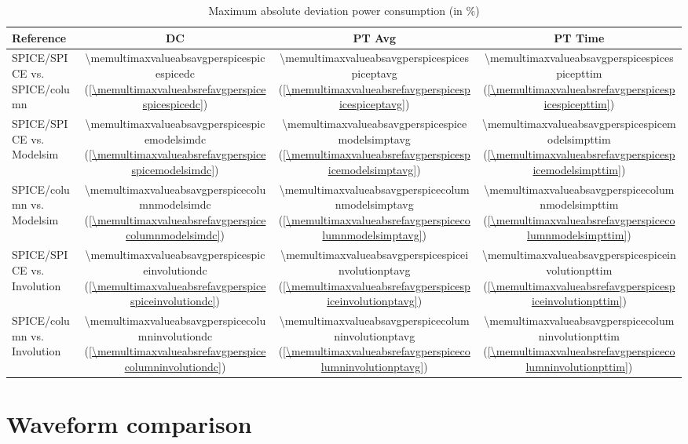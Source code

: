 \documentclass{article}
\begin{document}
\begin{table}[hbt]
\begin{tabular}{ l *{3}{|S[table-column-width=1.44cm]}} 
  {Reference} & {DC} & {PT Avg} & {PT Time} \\
  \hline			
  {SPICE/SPICE vs. SPICE/column} & 
  \num{\memultimaxvalueabsavgperspicespicespicedc} 
  {(\ref{\memultimaxvalueabsrefavgperspicespicespicedc})} & 
  \num{\memultimaxvalueabsavgperspicespicespiceptavg} 
  {(\ref{\memultimaxvalueabsrefavgperspicespicespiceptavg})} & 
  \num{\memultimaxvalueabsavgperspicespicespicepttim} 
  {(\ref{\memultimaxvalueabsrefavgperspicespicespicepttim})}\\
  \hline	
  {SPICE/SPICE vs. Modelsim} & 
  \num{\memultimaxvalueabsavgperspicespicemodelsimdc} 
  {(\ref{\memultimaxvalueabsrefavgperspicespicemodelsimdc})}& 
  \num{\memultimaxvalueabsavgperspicespicemodelsimptavg} 
  {(\ref{\memultimaxvalueabsrefavgperspicespicemodelsimptavg})}& 
  \num{\memultimaxvalueabsavgperspicespicemodelsimpttim} 
  {(\ref{\memultimaxvalueabsrefavgperspicespicemodelsimpttim})}\\
  {SPICE/column vs. Modelsim} & \num{\memultimaxvalueabsavgperspicecolumnmodelsimdc} {(\ref{\memultimaxvalueabsrefavgperspicecolumnmodelsimdc})}& \num{\memultimaxvalueabsavgperspicecolumnmodelsimptavg} {(\ref{\memultimaxvalueabsrefavgperspicecolumnmodelsimptavg})}& \num{\memultimaxvalueabsavgperspicecolumnmodelsimpttim} {(\ref{\memultimaxvalueabsrefavgperspicecolumnmodelsimpttim})}\\
  \hline	
  {SPICE/SPICE vs. Involution} & 
  \num{\memultimaxvalueabsavgperspicespiceinvolutiondc} 
  {(\ref{\memultimaxvalueabsrefavgperspicespiceinvolutiondc})}& 
  \num{\memultimaxvalueabsavgperspicespiceinvolutionptavg} 
  {(\ref{\memultimaxvalueabsrefavgperspicespiceinvolutionptavg})}& 
  \num{\memultimaxvalueabsavgperspicespiceinvolutionpttim} 
  {(\ref{\memultimaxvalueabsrefavgperspicespiceinvolutionpttim})}\\
  {SPICE/column vs. Involution} & \num{\memultimaxvalueabsavgperspicecolumninvolutiondc} {(\ref{\memultimaxvalueabsrefavgperspicecolumninvolutiondc})}& \num{\memultimaxvalueabsavgperspicecolumninvolutionptavg} {(\ref{\memultimaxvalueabsrefavgperspicecolumninvolutionptavg})}& \num{\memultimaxvalueabsavgperspicecolumninvolutionpttim} {(\ref{\memultimaxvalueabsrefavgperspicecolumninvolutionpttim})}\\
  \hline	
\end{tabular}
\caption{Maximum absolute deviation power consumption (in \si{\percent})}
\end{table}



\FloatBarrier
\section{Waveform comparison}

\FloatBarrier

\pagebreak
\FloatBarrier
\end{document}
